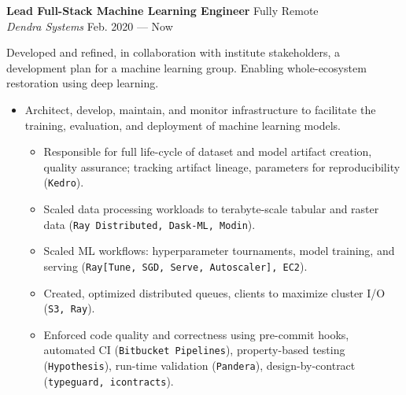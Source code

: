 \documentclass[a4paper,12pt]{article}
\newcommand{\ressubheading}[4]{{\begin{minipage}{\textwidth}
                                    \textbf{#1} \hfill #2 \\
                                    \textit{#3} \hfill #4 \\
\end{minipage}}}
\begin{document}
    \ressubheading{Lead Full-Stack Machine Learning Engineer}{Fully Remote}{Dendra Systems}{Feb. 2020 --- Now}

    \vspace{-6pt} Developed and refined, in collaboration with institute stakeholders, a development plan for a machine learning group.
    Enabling whole-ecosystem restoration using deep learning.
    \begin{itemize}
        \item Architect, develop, maintain, and monitor infrastructure to facilitate the training, evaluation, and deployment of machine learning models.
        \begin{itemize}
            \item Responsible for full life-cycle of dataset and model artifact creation, quality assurance;
            tracking artifact lineage, parameters for reproducibility (\texttt{Kedro}).
            \item Scaled data processing workloads to terabyte-scale tabular and raster data (\texttt{Ray Distributed, Dask-ML, Modin}).
            \item Scaled ML workflows: hyperparameter tournaments, model training, and serving (\texttt{Ray[Tune, SGD, Serve, Autoscaler], EC2}).
            \item Created, optimized distributed queues, clients to maximize cluster I/O (\texttt{S3, Ray}).
            \item Enforced code quality and correctness using pre-commit hooks, automated CI (\texttt{Bitbucket Pipelines}), property-based testing (\texttt{Hypothesis}), run-time validation (\texttt{Pandera}), design-by-contract (\texttt{typeguard, icontracts}).
        \end{itemize}


\end{itemize}
\end{document}
